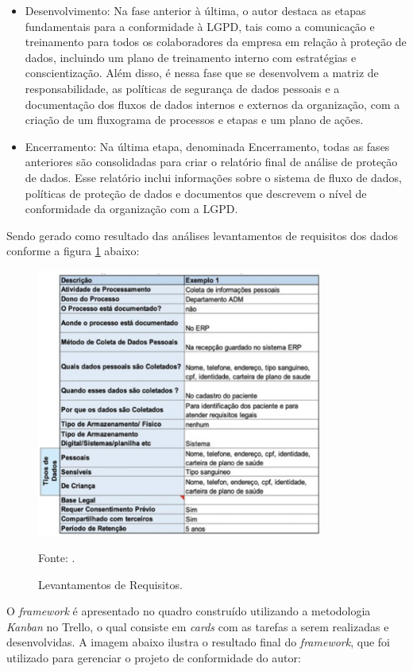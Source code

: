 \documentclass[
	12pt,				%
	openright,			%
	oneside,			%
	a4paper,			%
	english,			%
	french,				%
	spanish,			%
	brazil,				%
	]{abntex2}
\begin{document}
\begin{itemize}
\item Desenvolvimento: Na fase anterior à última, o autor destaca as etapas fundamentais para a conformidade à LGPD, tais como a comunicação e treinamento para todos os colaboradores da empresa em relação à proteção de dados, incluindo um plano de treinamento interno com estratégias e conscientização. Além disso, é nessa fase que se desenvolvem a matriz de responsabilidade, as políticas de segurança de dados pessoais e a documentação dos fluxos de dados internos e externos da organização, com a criação de um fluxograma de processos e etapas e um plano de ações.
\item Encerramento: Na última etapa, denominada Encerramento, todas as fases anteriores são consolidadas para criar o relatório final de análise de proteção de dados. Esse relatório inclui informações sobre o sistema de fluxo de dados, políticas de proteção de dados e documentos que descrevem o nível de conformidade da organização com a LGPD.
\end{itemize}

Sendo gerado como resultado das análises levantamentos de requisitos dos dados conforme a figura \ref{fig: silva21A} abaixo:

\begin{figure}[ht]
    \centering
    \caption{Levantamentos de Requisitos.}
    \includegraphics[width=3.7in]{Images/16Silva2021.png}
    \label{fig: silva21A}
    
    \centering \small Fonte: \cite{silva2021w}.
\end{figure}

\pagebreak

O \textit{framework} é apresentado no quadro construído utilizando a metodologia \textit{Kanban} no Trello, o qual consiste em \textit{cards} com as tarefas a serem realizadas e desenvolvidas. A imagem abaixo ilustra o resultado final do \textit{framework}, que foi utilizado para gerenciar o projeto de conformidade do autor:
\end{document}
